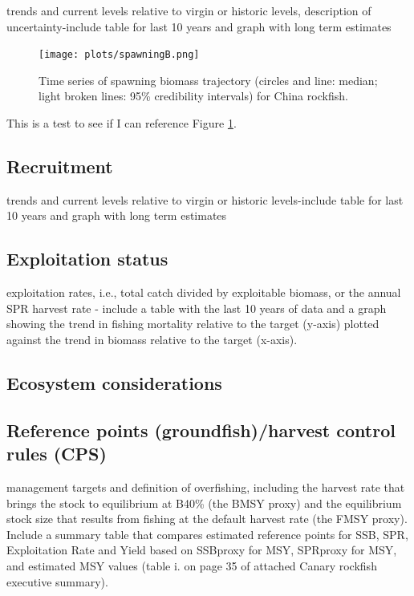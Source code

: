 \documentclass[12pt,]{article}
\begin{document}
trends and current levels relative to virgin or historic levels,
description of uncertainty-include table for last 10 years and graph
with long term estimates

\begin{figure}[htbp]
\centering
\texttt{[image: plots/spawningB.png]}
\caption{Time series of spawning biomass trajectory (circles and line:
median; light broken lines: 95\% credibility intervals) for China
rockfish. \label{spawningB}}
\end{figure}

This is a test to see if I can reference Figure \ref{spawningB}.

\subsection*{Recruitment}\label{recruitment}

trends and current levels relative to virgin or historic levels-include
table for last 10 years and graph with long term estimates

\subsection*{Exploitation status}\label{exploitation-status}

exploitation rates, i.e., total catch divided by exploitable biomass, or
the annual SPR harvest rate - include a table with the last 10 years of
data and a graph showing the trend in fishing mortality relative to the
target (y-axis) plotted against the trend in biomass relative to the
target (x-axis).

\subsection*{Ecosystem considerations}\label{ecosystem-considerations}

\subsection*{Reference points (groundfish)/harvest control rules
(CPS)}\label{reference-points-groundfishharvest-control-rules-cps}

management targets and definition of overfishing, including the harvest
rate that brings the stock to equilibrium at B40\% (the BMSY proxy) and
the equilibrium stock size that results from fishing at the default
harvest rate (the FMSY proxy). Include a summary table that compares
estimated reference points for SSB, SPR, Exploitation Rate and Yield
based on SSBproxy for MSY, SPRproxy for MSY, and estimated MSY values
(table i. on page 35 of attached Canary rockfish executive summary).
\end{document}
